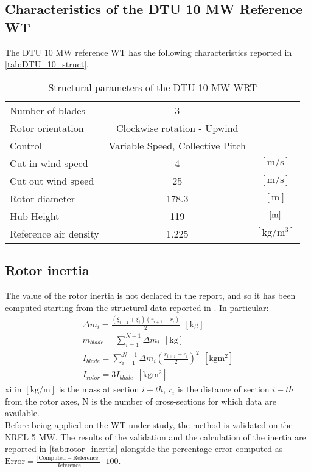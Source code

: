 \subsection{Characteristics of the DTU 10 MW Reference WT}
The DTU 10 MW reference WT has the following characteristics reported in \autoref{tab:DTU_10_struct}.
\begin{table}[htb]
    \caption{Structural parameters of the DTU 10 MW \acrshort{WRT}}
    \centering
    \begin{tabular}{lcc}
    \toprule
    Number of blades & 3 & \\
    Rotor orientation & Clockwise rotation - Upwind & \\
    Control & Variable Speed, Collective Pitch & \\
    Cut in wind speed & 4 & $\left[\si{\meter \per \second}\right]$ \\
    Cut out wind speed & 25 & $\left[\si{\meter \per \second}\right]$ \\
    Rotor diameter & 178.3 & $\left[\si{\meter}\right]$\\
    Hub Height & 119 & $\left[\si{\meter}\right]$\\
    Reference air density & 1.225 & $\left[\si{\kilo\gram\per\cubic\meter}\right]$\\
    \bottomrule
    \end{tabular}
    \label{tab:DTU_10_struct}
\end{table}

\subsection{Rotor inertia}
The value of the rotor inertia is not declared in the report, and so it has been computed starting from the structural data reported in \cite{DTU_Wind_Energy_Report-I-0092}. In particular:
\begin{gather}
    \Delta m_i=\frac{\left(\xi_{i+1} + \xi_i\right)\left(r_{i+1} - r_i\right)}{2} \ \ \left[\si{\kilo\gram}\right] \\
    m_{blade} = \sum_{i=1}^{N-1}\Delta m_i \ \ \left[\si{\kilo\gram}\right]\\
    I_{blade}=\sum_{i=1}^{N-1}\Delta m_i\left(\frac{r_{i+1} - r_i}{2}\right)^2 \ \ \left[\si{\kilo\gram\square\meter}\right]\\
    I_{rotor}=3I_{blade} \ \ \left[\si{\kilo\gram\square\meter}\right]
\end{gather}
\acrshort{xi} in $ \left[\si{\kilo\gram\per\meter}\right]$ is the mass at section $i-th$, $r_i$ is the distance of section $i-th$ from the rotor axes, \acrshort{N} is the number of cross-sections for which data are available.\\
Before being applied on the \acrshort{WT} under study, the method is validated on the NREL 5 MW. The results of the validation and the calculation of the inertia are reported in \autoref{tab:rotor_inertia} alongside the percentage error computed as $\text{Error}=\frac{ |\text{Computed} - \text{Reference}| }{\text{Reference}}\cdot 100$.

